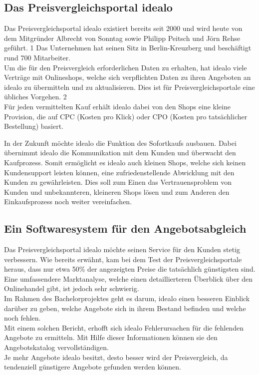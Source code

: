 \subsection{Das Preisvergleichsportal idealo}
\label{sec:einleitung-2}


Das Preisvergleichsportal idealo existiert bereits seit 2000 und wird heute von dem Mitgründer Albrecht von Sonntag
sowie Philipp Peitsch und Jörn Rehse geführt. 1
Das Unternehmen hat seinen Sitz in Berlin-Kreuzberg und beschäftigt rund 700 Mitarbeiter.\\
Um die für den Preisvergleich erforderlichen Daten zu erhalten, hat idealo viele Verträge mit Onlineshops, welche
sich verpflichten Daten zu ihren Angeboten an idealo zu übermitteln und zu aktualisieren.
Dies ist für Preisvergleichsportale eine übliches Vorgehen. 2\\
Für jeden vermittelten Kauf erhält idealo dabei von den Shops eine kleine Provision, die auf CPC (Kosten pro Klick)
oder CPO (Kosten pro tatsächlicher Bestellung) basiert.

In der Zukunft möchte idealo die Funktion des Sofortkaufs ausbauen.
Dabei übernimmt idealo die Kommunikation mit dem Kunden und überwacht den Kaufprozess.
Somit ermöglicht es idealo auch kleinen Shops, welche sich keinen Kundensupport leisten können, eine
zufriedenstellende Abwicklung mit den Kunden zu gewährleisten.
Dies soll zum Einen das Vertrauensproblem von Kunden und unbekannteren, kleineren Shops lösen und zum Anderen den
Einkaufsprozess noch weiter vereinfachen.

\subsection{Ein Softwaresystem für den Angebotsabgleich}

Das Preisvergleichsportal idealo möchte seinen Service für den Kunden stetig verbessern.
Wie bereits erwähnt, kam bei dem Test der Preisvergleichsportale heraus, dass nur etwa 50\% der angezeigten Preise
die tatsächlich günstigsten sind.
Eine umfassendere Marktanalyse, welche einen detaillierteren Überblick über den Onlinehandel gibt, ist jedoch sehr
schwierig. \\
Im Rahmen des Bachelorprojektes geht es darum, idealo einen besseren Einblick darüber zu geben, welche Angebote sich
in ihrem Bestand befinden und welche noch fehlen. \\
Mit einem solchen Bericht, erhofft sich idealo Fehlerursachen für die fehlenden Angebote zu ermitteln.
Mit Hilfe dieser Informationen können sie den Angebotskatalog vervollständigen. \\
Je mehr Angebote idealo besitzt, desto besser wird der Preisvergleich, da tendenziell günstigere Angebote gefunden
werden können.

